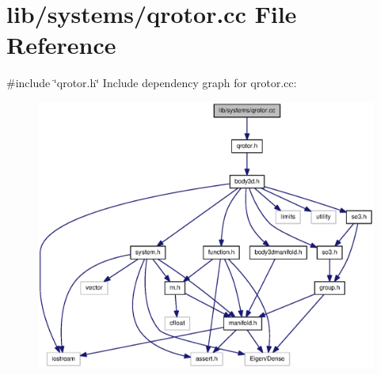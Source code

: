 \section{lib/systems/qrotor.cc \-File \-Reference}
\label{qrotor_8cc}
{\ttfamily \#include \char`\"{}qrotor.\-h\char`\"{}}\*
\-Include dependency graph for qrotor.\-cc\-:\nopagebreak
\begin{figure}[H]
\begin{center}
\leavevmode
\includegraphics[width=350pt]{qrotor_8cc__incl}
\end{center}
\end{figure}

